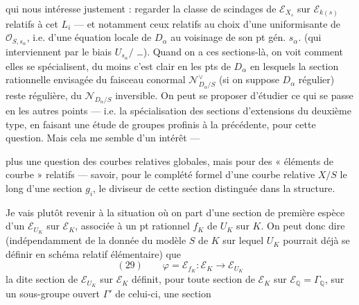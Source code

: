 \documentclass[11pt,a4paper]{article}
\begin{document}

qui nous intéresse justement : regarder la classe de scindages de
$\mathcal{E}_{X_s}$ sur $\mathcal{E}_{k(s)}$ relatifs à cet $L_i$ — et notamment
ceux relatifs au choix d'une uniformisante de $\mathcal{O}_{S,s_\alpha}$, i.e.
d'une équation locale de $D_\alpha$ au voisinage de son pt gén. $s_\alpha$.
 (qui interviennent par le biais  $U_{s_\alpha}/$ …). Quand on a ces sections-là, on voit comment
elles se spécialisent, du moins c'est clair en les pts de $D_\alpha$ en lesquels
la section rationnelle envisagée du faisceau conormal
$\mathcal{N}^{\vee}_{D_\alpha/S}$ (si on suppose $D_\alpha$ régulier) reste
régulière,  du $\mathcal{N}_{D_\alpha/S}$ inversible. On peut se
proposer d'étudier  ce qui se passe en les autres points —
i.e. la spécialisation des sections d'extensions du deuxième type, en faisant
une étude de groupes profinis  à la précédente, pour cette
question. Mais cela me semble d'un intérêt  — \ill{}

plus une question \ill{} des courbes relatives globales, mais pour des
« éléments de courbe » relatifs — savoir, pour le complété formel d'une courbe
relative $X/S$ le long d'une section $g_i$,  le diviseur de cette
section distinguée dans la structure.

Je vais plutôt revenir à la situation où on part d'une section de première
espèce d'un $\mathcal{E}_{U_K}$ sur $\mathcal{E}_K$, associée à un pt rationnel
$f_K$ de $U_K$ sur $K$. On peut donc dire (indépendamment de la donnée du modèle
$S$ de $K$ sur lequel $U_K$ pourrait déjà se définir \struck{\ill{}} en schéma
relatif élémentaire) que
\[
  (29)\qquad \varphi = \mathcal{E}_{f_K} \colon \mathcal{E}_K \longrightarrow \mathcal{E}_{U_K}
\]
la dite section de $\mathcal{E}_{U_K}$ sur $\mathcal{E}_K$ définit, pour toute
section de $\mathcal{E}_K$ sur $\mathcal{E}_{\mathbb{Q}} = \Gamma_{\mathbb{Q}}$,
 sur un sous-groupe ouvert $\Gamma'$ de celui-ci, une
section

\end{document}
